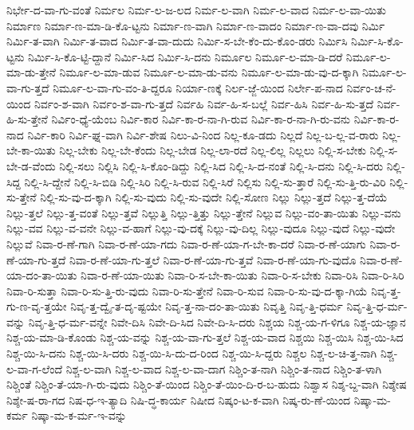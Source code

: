 {ನಿರ್ಭೇ-ದ-ವಾ-ಗು-ವಂತೆ
ನಿರ್ಮಲ
ನಿರ್ಮ-ಲ-ಜ-ಲದ
ನಿರ್ಮ-ಲ-ವಾಗಿ
ನಿರ್ಮ-ಲ-ವಾದ
ನಿರ್ಮ-ಲ-ವಾ-ಯಿತು
ನಿರ್ಮಾಣ
ನಿರ್ಮಾ-ಣ-ಮಾ-ಡಿ-ಕೊ-ಟ್ಟನು
ನಿರ್ಮಾ-ಣ-ವಾಗಿ
ನಿರ್ಮಾ-ಣ-ವಾದಂ
ನಿರ್ಮಾ-ಣ-ವಾ-ದವು
ನಿರ್ಮಿ
ನಿರ್ಮಿ-ತ-ವಾಗಿ
ನಿರ್ಮಿ-ತ-ವಾದ
ನಿರ್ಮಿ-ತ-ವಾ-ದುದು
ನಿರ್ಮಿ-ಸ-ಬೇ-ಕೆಂ-ದು-ಕೊಂ-ಡರು
ನಿರ್ಮಿಸಿ
ನಿರ್ಮಿ-ಸಿ-ಕೊ-ಟ್ಟನು
ನಿರ್ಮಿ-ಸಿ-ಕೊ-ಟ್ಟಿ-ದ್ದಾನೆ
ನಿರ್ಮಿ-ಸಿದ
ನಿರ್ಮಿ-ಸಿ-ದನು
ನಿರ್ಮೂಲ
ನಿರ್ಮೂ-ಲ-ಮಾ-ಡಿ-ದರೆ
ನಿರ್ಮೂ-ಲ-ಮಾ-ಡು-ತ್ತೇನೆ
ನಿರ್ಮೂ-ಲ-ಮಾ-ಡುವ
ನಿರ್ಮೂ-ಲ-ಮಾ-ಡು-ವನು
ನಿರ್ಮೂ-ಲ-ಮಾ-ಡು-ವು-ದ-ಕ್ಕಾಗಿ
ನಿರ್ಮೂ-ಲ-ವಾ-ಗು-ತ್ತದೆ
ನಿರ್ಮೂ-ಲ-ವಾ-ಗು-ವಂ-ತಿ-ದ್ದರೂ
ನಿರ್ಯಾ-ಣಕ್ಕೆ
ನಿರ್ಲ-ಜ್ಜೆ-ಯಿಂದ
ನಿರ್ಲೇ-ಪ-ನಾದ
ನಿರ್ವಂ-ಚ-ನೆ-ಯಿಂದ
ನಿರ್ವಂ-ಶ-ವಾಗಿ
ನಿರ್ವಂ-ಶ-ವಾ-ಗು-ತ್ತದೆ
ನಿರ್ವಹಿ
ನಿರ್ವ-ಹಿ-ಸ-ಬಲ್ಲೆ
ನಿರ್ವ-ಹಿಸಿ
ನಿರ್ವ-ಹಿ-ಸು-ತ್ತದೆ
ನಿರ್ವ-ಹಿ-ಸು-ತ್ತೇನೆ
ನಿರ್ವಿಂ-ಧ್ಯೆ-ಯೆಂಬ
ನಿರ್ವಿ-ಕಾರ
ನಿರ್ವಿ-ಕಾ-ರ-ನಾ-ಗಿ-ರುವ
ನಿರ್ವಿ-ಕಾ-ರ-ನಾ-ಗಿ-ರು-ವನು
ನಿರ್ವಿ-ಕಾ-ರ-ನಾದ
ನಿರ್ವಿ-ಕಾರಿ
ನಿರ್ವಿ-ಘ್ನ-ವಾಗಿ
ನಿರ್ವಿ-ಶೇಷ
ನಿಲು-ವಿ-ನಿಂದ
ನಿಲ್ಲ-ಕೂ-ಡದು
ನಿಲ್ಲದೆ
ನಿಲ್ಲ-ಬ-ಲ್ಲ-ವ-ರಾರು
ನಿಲ್ಲ-ಬೇ-ಕಾ-ಯಿತು
ನಿಲ್ಲ-ಬೇಕು
ನಿಲ್ಲ-ಬೇ-ಕೆಂದು
ನಿಲ್ಲ-ಬೇಡ
ನಿಲ್ಲ-ಲಾ-ರದೆ
ನಿಲ್ಲ-ಲಿಲ್ಲ
ನಿಲ್ಲಲು
ನಿಲ್ಲಿ-ಸ-ಬೇಕು
ನಿಲ್ಲಿ-ಸ-ಬೇ-ಡ-ವೆಂದು
ನಿಲ್ಲಿ-ಸಲು
ನಿಲ್ಲಿಸಿ
ನಿಲ್ಲಿ-ಸಿ-ಕೊಂ-ಡಿದ್ದು
ನಿಲ್ಲಿ-ಸಿದ
ನಿಲ್ಲಿ-ಸಿ-ದ-ನಂತೆ
ನಿಲ್ಲಿ-ಸಿ-ದನು
ನಿಲ್ಲಿ-ಸಿ-ದರು
ನಿಲ್ಲಿ-ಸಿದ್ದ
ನಿಲ್ಲಿ-ಸಿ-ದ್ದೇನೆ
ನಿಲ್ಲಿ-ಸಿ-ಬಿಡಿ
ನಿಲ್ಲಿ-ಸಿರಿ
ನಿಲ್ಲಿ-ಸಿ-ರುವ
ನಿಲ್ಲಿ-ಸಿರೆ
ನಿಲ್ಲಿಸು
ನಿಲ್ಲಿ-ಸು-ತ್ತಾರೆ
ನಿಲ್ಲಿ-ಸು-ತ್ತಿ-ರು-ವಿರಿ
ನಿಲ್ಲಿ-ಸು-ತ್ತೇನೆ
ನಿಲ್ಲಿ-ಸು-ವು-ದ-ಕ್ಕಾಗಿ
ನಿಲ್ಲಿ-ಸು-ವುದು
ನಿಲ್ಲಿ-ಸು-ವುದೇ
ನಿಲ್ಲಿ-ಸೋಣ
ನಿಲ್ಲು
ನಿಲ್ಲು-ತ್ತದೆ
ನಿಲ್ಲು-ತ್ತ-ದೆಯೆ
ನಿಲ್ಲು-ತ್ತಲೆ
ನಿಲ್ಲು-ತ್ತ-ವಂತೆ
ನಿಲ್ಲು-ತ್ತವೆ
ನಿಲ್ಲುತ್ತಿ
ನಿಲ್ಲು-ತ್ತಿತ್ತು
ನಿಲ್ಲು-ತ್ತೇನೆ
ನಿಲ್ಲುವ
ನಿಲ್ಲು-ವಂ-ತಾ-ಯಿತು
ನಿಲ್ಲು-ವನು
ನಿಲ್ಲು-ವವ
ನಿಲ್ಲು-ವ-ವನೇ
ನಿಲ್ಲು-ವ-ಹಾಗೆ
ನಿಲ್ಲು-ವು-ದಕ್ಕೆ
ನಿಲ್ಲು-ವು-ದಿಲ್ಲ
ನಿಲ್ಲು-ವುದೂ
ನಿಲ್ಲು-ವುದೆ
ನಿಲ್ಲು-ವುದೇ
ನಿಲ್ಲುವೆ
ನಿವಾ-ರ-ಣೆ-ಗಾಗಿ
ನಿವಾ-ರ-ಣೆ-ಯಾ-ಗದು
ನಿವಾ-ರ-ಣೆ-ಯಾ-ಗ-ಬೇ-ಕಾ-ದರೆ
ನಿವಾ-ರ-ಣೆ-ಯಾಗು
ನಿವಾ-ರ-ಣೆ-ಯಾ-ಗು-ತ್ತದೆ
ನಿವಾ-ರ-ಣೆ-ಯಾ-ಗು-ತ್ತಲೆ
ನಿವಾ-ರ-ಣೆ-ಯಾ-ಗು-ತ್ತವೆ
ನಿವಾ-ರ-ಣೆ-ಯಾ-ಗು-ವುದೊ
ನಿವಾ-ರ-ಣೆ-ಯಾ-ದಂ-ತಾ-ಯಿತು
ನಿವಾ-ರ-ಣೆ-ಯಾ-ಯಿತು
ನಿವಾ-ರಿ-ಸ-ಬೇ-ಕಾ-ಯಿತು
ನಿವಾ-ರಿ-ಸ-ಬೇಕು
ನಿವಾ-ರಿಸಿ
ನಿವಾ-ರಿ-ಸಿರಿ
ನಿವಾ-ರಿ-ಸುತ್ತಾ
ನಿವಾ-ರಿ-ಸು-ತ್ತಿ-ರು-ವುದು
ನಿವಾ-ರಿ-ಸು-ತ್ತೇನೆ
ನಿವಾ-ರಿ-ಸುವ
ನಿವಾ-ರಿ-ಸು-ವು-ದ-ಕ್ಕಾ-ಗಿಯೆ
ನಿವೃ-ತ್ತ-ಗು-ಣ-ವೃ-ತ್ತಯೇ
ನಿವೃ-ತ್ತ-ದ್ವೈ-ತ-ದೃ-ಷ್ಟಯೇ
ನಿವೃ-ತ್ತ-ನಾ-ದಂ-ತಾ-ಯಿತು
ನಿವೃತ್ತಿ
ನಿವೃ-ತ್ತಿ-ಧರ್ಮ
ನಿವೃ-ತ್ತಿ-ಧ-ರ್ಮ-ವನ್ನು
ನಿವೃ-ತ್ತಿ-ಧ-ರ್ಮ-ವನ್ನೇ
ನಿವೇ-ದಿಸಿ
ನಿವೇ-ದಿ-ಸಿದ
ನಿವೇ-ದಿ-ಸಿ-ದರು
ನಿಶ್ಚಯ
ನಿಶ್ಚ-ಯ-ಗ-ಳಿಗೂ
ನಿಶ್ಚ-ಯ-ಜ್ಞಾನ
ನಿಶ್ಚ-ಯ-ಮಾ-ಡಿ-ಕೊಂಡು
ನಿಶ್ಚ-ಯ-ವನ್ನು
ನಿಶ್ಚ-ಯ-ವಾ-ಗು-ತ್ತಲೆ
ನಿಶ್ಚ-ಯ-ವಾದ
ನಿಶ್ಚಯಿ
ನಿಶ್ಚ-ಯಿಸಿ
ನಿಶ್ಚ-ಯಿ-ಸಿದ
ನಿಶ್ಚ-ಯಿ-ಸಿ-ದನು
ನಿಶ್ಚ-ಯಿ-ಸಿ-ದರು
ನಿಶ್ಚ-ಯಿ-ಸಿ-ದು-ದ-ರಿಂದ
ನಿಶ್ಚ-ಯಿ-ಸಿ-ದ್ದರು
ನಿಶ್ಚಲ
ನಿಶ್ಚ-ಲ-ಚಿ-ತ್ತ-ನಾಗಿ
ನಿಶ್ಚ-ಲ-ವಾ-ಗ-ಲೆಂದೆ
ನಿಶ್ಚ-ಲ-ವಾಗಿ
ನಿಶ್ಚ-ಲ-ವಾದ
ನಿಶ್ಚ-ಲ-ವಾ-ದಾಗ
ನಿಶ್ಚಿಂ-ತ-ನಾಗಿ
ನಿಶ್ಚಿಂ-ತ-ನಾದ
ನಿಶ್ಚಿಂ-ತ-ಳಾಗಿ
ನಿಶ್ಚಿಂತೆ
ನಿಶ್ಚಿಂ-ತೆ-ಯಾ-ಗಿ-ರು-ವುದು
ನಿಶ್ಚಿಂ-ತೆ-ಯಿಂದ
ನಿಶ್ಚಿಂ-ತೆ-ಯಿಂ-ದಿ-ರ-ಬ-ಹುದು
ನಿಶ್ವಾಸ
ನಿಶ್ಶ-ಬ್ದ-ವಾಗಿ
ನಿಶ್ಶೇಷ
ನಿಶ್ಶೇ-ಷ-ರಾ-ಗದ
ನಿಷ-ಧ-ಇ-ತ್ಯಾದಿ
ನಿಷಿ-ದ್ಧ-ಕಾರ್ಯ
ನಿಷೀದ
ನಿಷ್ಕಂ-ಟ-ಕ-ವಾಗಿ
ನಿಷ್ಕ-ರು-ಣೆ-ಯಿಂದ
ನಿಷ್ಕಾ-ಮ-ಕರ್ಮ
ನಿಷ್ಕಾ-ಮ-ಕ-ರ್ಮ-ಇ-ವನ್ನು
}
